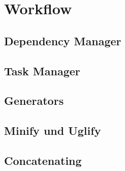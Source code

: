\section{Workflow} %
\label{sec:workflow}

	\subsection{Dependency Manager}
	\label{sub:dependency_manager}
	

	\subsection{Task Manager}
	\label{sub:task_manager}
	

	\subsection{Generators}
	\label{sub:generators}
	

	\subsection{Minify und Uglify}
	\label{sub:minify_und_uglify}
	

	\subsection{Concatenating}
	\label{sub:concatenating}
	

	


